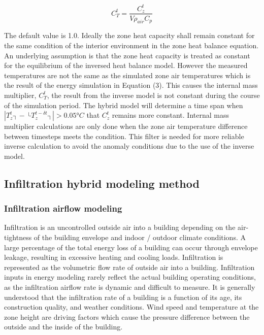 \begin{equation}
C_T^t = \frac{C_z^t} {Vρ_{air} C_p}
\end{equation}

The default value is 1.0. Ideally the zone heat capacity shall remain constant for the same condition of the interior environment in the zone heat balance equation. An underlying assumption is that the zone heat capacity is treated as constant for the equilibrium of the inversed heat balance model. However the measured temperatures are not the same as the simulated zone air temperatures which is the result of the energy simulation in Equation (3). This causes the internal mass multiplier, $C_T^t$, the result from the inverse model is not constant during the course of the simulation period. The hybrid model will determine a time span when $|T_z^t ┤-├ T_z^{t-δt} ┤|>0.05°C$ that $C_z^t$ remains more constant. Internal mass multiplier calculations are only done when the zone air temperature difference between timesteps meets the condition. This filter is needed for more reliable inverse calculation to avoid the anomaly conditions due to the use of the inverse model.  

\subsection{Infiltration hybrid modeling method}\label{Infiltration hybrid modeling method}

\subsubsection{Infiltration airflow modeling}\label{Infiltration airflow modeling}

Infiltration is an uncontrolled outside air into a building depending on the air-tightness of the building envelope and indoor / outdoor climate conditions. A large percentage of the total energy loss of a building can occur through envelope leakage, resulting in excessive heating and cooling loads. Infiltration is represented as the volumetric flow rate of outside air into a building. Infiltration inputs in energy modeling rarely reflect the actual building operating conditions, as the infiltration airflow rate is dynamic and difficult to measure. It is generally understood that the infiltration rate of a building is a function of its age, its construction quality, and weather conditions. Wind speed and temperature at the zone height are driving factors which cause the pressure difference between the outside and the inside of the building.

